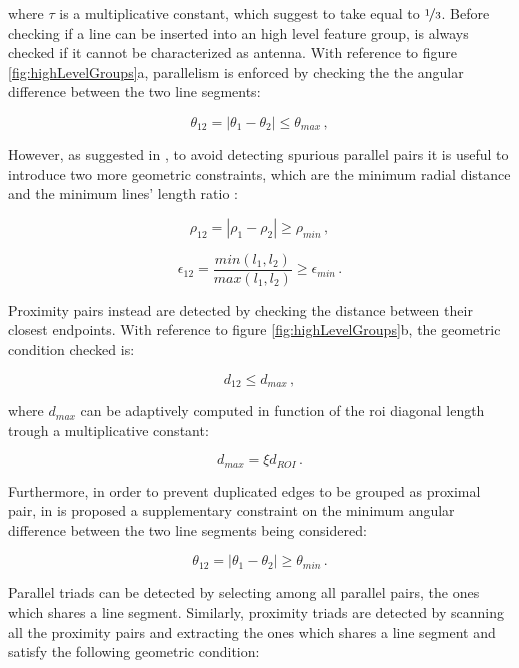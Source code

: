 where $\tau$ is a multiplicative constant, which \cite{Sharma2018} suggest to take equal to $\nicefrac{1}{3}$. Before checking if a line can be inserted into an high level feature group, is always checked if it cannot be characterized as antenna.
With reference to figure \ref{fig:highLevelGroups}a, parallelism is enforced by checking the the angular difference between the two line segments:

\begin{equation}
  \theta_{12} = |\theta_1 - \theta_2| \leqslant \theta_{max} \,,
\end{equation}

However, as suggested in \cite{fracchio2019}, to avoid detecting spurious parallel pairs it is useful to introduce two more geometric constraints, which are the minimum radial distance and the minimum lines' length ratio :

\begin{equation}
  \rho_{12} = |\rho_1 - \rho_2| \geq  \rho_{min} \,,
\end{equation}

\begin{equation}
  \epsilon_{12} = \frac{min(l_1,l_2)}{max(l_1,l_2)} \geq \epsilon_{min} \,.
\end{equation}

Proximity pairs instead are detected by checking the distance between their closest endpoints. With reference to figure  \ref{fig:highLevelGroups}b, the geometric condition checked is:

\begin{equation}
  d_{12} \leqslant d_{max} \,,
\end{equation}

where $d_{max}$ can be adaptively computed in function of the \acrshort{roi} diagonal length trough a multiplicative constant:

\begin{equation}
  d_{max} = \xi d_{ROI} \,.
\end{equation}

Furthermore, in order to prevent duplicated edges to be grouped as proximal pair, in \cite{fracchio2019} is proposed a supplementary constraint on the minimum angular difference between the two line segments being considered:

\begin{equation}
  \theta_{12} = |\theta_1 - \theta_2| \geq \theta_{min} \,.
\end{equation}

Parallel triads can be detected by selecting among all parallel pairs, the ones which shares a line segment. Similarly, proximity triads are detected by scanning all the proximity pairs and extracting the ones which shares a line segment and satisfy the following geometric condition:

